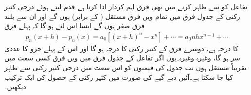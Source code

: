 تفاعل کو  سے ظاہر کرنے میں بھی فرق اہم کردار ادا کرتا ہے۔قدم  لیتے ہوئے  درجی کثیر رکنی  کے جدول فرق میں تمام  ویں فرق مستقل ( کے برابر) ہوں گے اور ان سے بلند فرق صفر ہوں گے۔ایسا اس لئے ہو گا کہ پہلے فرق 
\begin{align*}
p_n(x+h)-p_n(x)=a_0[(x+h)^n-x^n]+\cdots=a_0nhx^{n-1}+\cdots
\end{align*} 
کا درجہ  ہے، دوسرے فرق کے کثیر رکنی کا درجہ  ہو گا اور اس کے پہلے جزو کا عددی سر  ہو گا، وغیرہ وغیرہ۔یوں  اگر تفاعل  کے جدول فرق میں  ویں فرق کسی سعت میں تقریباً مستقل ہوں تب جدول کی قیمتوں کو اس سعت میں  درجی کثیر رکنی  سے ظاہر کیا جا سکتا ہے۔آئیں دیے  گیے   کی صورت میں کثیر رکنی  کے حصول کی ایک ترکیب دیکھیں۔     

